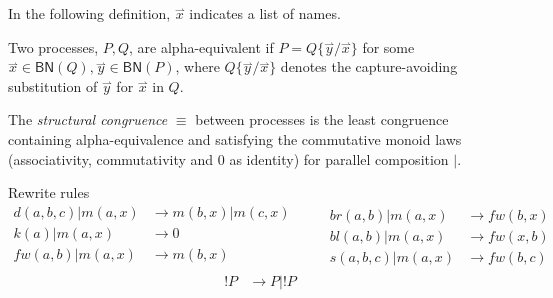 \documentclass{llncs}
\newcommand{\pzero}{\mathbin{0}}
\newcommand{\scong}{\mathbin{\equiv}}
\newcommand{\boundnames}[1]{\mathbin{\mathsf{BN}(#1)}}
\newcommand{\red}{\rightarrow}
\newcommand{\vect}[1]{\stackrel{\rightharpoonup}{#1}}
\begin{document}
In the following definition, $\vect{x}$ indicates a list of names.

\begin{definition}
Two processes, $P,Q$, are alpha-equivalent if $P = Q\{\vect{y}/\vect{x}\}$ for
some $\vect{x} \in \boundnames{Q},\vect{y} \in \boundnames{P}$, where $Q\{\vect{y}/\vect{x}\}$
denotes the capture-avoiding substitution of $\vect{y}$ for $\vect{x}$ in $Q$.
\end{definition}

\begin{definition}
  The {\em structural congruence} $\equiv$
  between processes \cite{SangiorgiWalker} is the least congruence containing
  alpha-equivalence and satisfying the commutative monoid laws
  (associativity, commutativity and $\pzero$ as identity) for parallel
  composition $|$.
\end{definition}

Rewrite rules
\[\begin{array}{rl}
  d(a,b,c) | m(a,x) & \red m(b,x) | m(c,x) \\
  k(a) | m(a,x) & \red 0 \\
  fw(a,b) | m(a,x) & \red m(b,x) \\
\end{array} \quad \quad
\begin{array}{rl}
  br(a,b) | m(a,x) & \red fw(b,x) \\
  bl(a,b) | m(a,x) & \red fw(x,b) \\
  s(a,b,c) | m(a,x) & \red fw(b,c)
\end{array}\]
\[\begin{array}{rl}
  !P & \red P|!P \\
\end{array}\]
\end{document}
